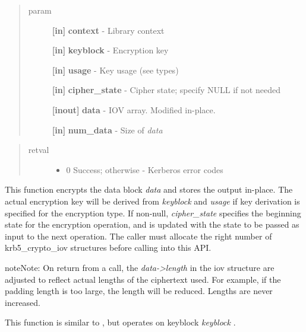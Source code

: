 \documentclass[letterpaper,10pt,english]{sphinxmanual}
\begin{document}
\begin{quote}\begin{description}
\item[{param}] \leavevmode
\textbf{{[}in{]}} \textbf{context} - Library context

\textbf{{[}in{]}} \textbf{keyblock} - Encryption key

\textbf{{[}in{]}} \textbf{usage} - Key usage (see  types)

\textbf{{[}in{]}} \textbf{cipher\_state} - Cipher state; specify NULL if not needed

\textbf{{[}inout{]}} \textbf{data} - IOV array. Modified in-place.

\textbf{{[}in{]}} \textbf{num\_data} - Size of \emph{data}

\end{description}\end{quote}
\begin{quote}\begin{description}
\item[{retval}] \leavevmode\begin{itemize}
\item {} 
0   Success; otherwise - Kerberos error codes

\end{itemize}

\end{description}\end{quote}

This function encrypts the data block \emph{data} and stores the output in-place. The actual encryption key will be derived from \emph{keyblock} and \emph{usage} if key derivation is specified for the encryption type. If non-null, \emph{cipher\_state} specifies the beginning state for the encryption operation, and is updated with the state to be passed as input to the next operation. The caller must allocate the right number of krb5\_crypto\_iov structures before calling into this API.




{\hyperref[appdev/refs/api/krb5_c_decrypt_iov:c.krb5_c_decrypt_iov]{}}



\begin{notice}{note}{Note:}
On return from a {\hyperref[appdev/refs/api/krb5_c_encrypt_iov:c.krb5_c_encrypt_iov]{}} call, the \emph{data-\textgreater{}length} in the iov structure are adjusted to reflect actual lengths of the ciphertext used. For example, if the padding length is too large, the length will be reduced. Lengths are never increased.

This function is similar to {\hyperref[appdev/refs/api/krb5_k_encrypt_iov:c.krb5_k_encrypt_iov]{}} , but operates on keyblock \emph{keyblock} .
\end{notice}
\end{document}
